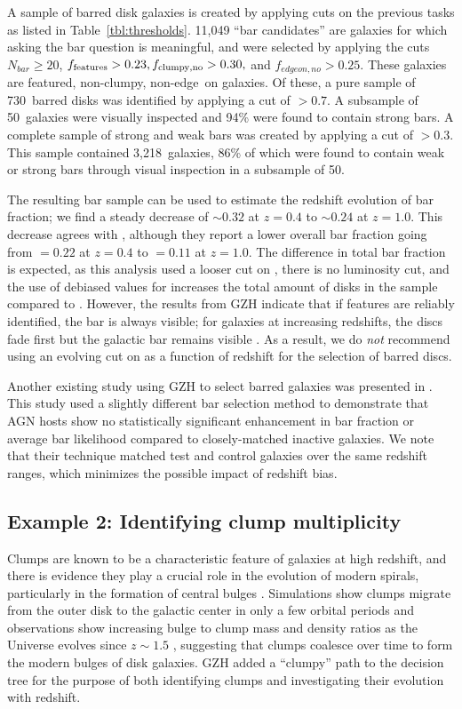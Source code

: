 \documentclass[twocolumn]{aastex6}
\begin{document}
A sample of barred disk galaxies is created by applying cuts on the previous
tasks as listed in Table~\ref{tbl:thresholds}. 11,049 ``bar candidates'' are
galaxies for which asking the bar question is meaningful, and were selected by
applying the cuts $N_{bar} \ge 20$, $f_{\rm features}>0.23, f_{\rm clumpy,no} >
0.30,$ and $f_{edgeon,no}>0.25$. These galaxies are featured, non-clumpy,
non-edge~on galaxies. Of these, a pure sample of 730~barred disks was
identified by applying a cut of \fbar$>0.7$. A subsample of 50~galaxies were
visually inspected and 94\% were found to contain strong bars. A complete
sample of strong and weak bars was created by applying a cut of \fbar$>0.3$.
This sample contained 3,218~galaxies, 86\% of which were found to contain weak
or strong bars through visual inspection in a subsample of 50.

The resulting bar sample can be used to estimate the redshift evolution of bar
fraction; we find a steady decrease of \fbar$\sim 0.32$ at $z=0.4$ to
\fbar$\sim 0.24$ at $z=1.0$. This decrease agrees with
\citet{mel14}, although they report a lower overall bar fraction going from
\fbar$=0.22$ at $z=0.4$ to \fbar$=0.11$ at $z=1.0$. The difference in total bar
fraction is expected, as this analysis used a looser cut on \fbar, there is no
luminosity cut, and the use of debiased values for \ffeatures{} increases the
total amount of disks in the sample compared to \citet{mel14}. However, the
results from GZH indicate that if features are reliably identified, the bar is
always visible; for galaxies at increasing redshifts, the discs fade first but
the galactic bar remains visible \citep{mel16}. As a result, we do \emph{not}
recommend using an evolving cut on \fbar{} as a function of redshift for the
selection of barred discs. 

Another existing study using GZH to select barred galaxies was presented in
\citet{che15}. This study used a slightly different bar selection method to
demonstrate that AGN hosts show no statistically significant enhancement in bar
fraction or average bar likelihood compared to closely-matched inactive
galaxies. We note that their technique matched test and control galaxies over
the same redshift ranges, which minimizes the possible impact of redshift bias.

\subsection{Example 2: Identifying clump multiplicity} Clumps are known to be a
characteristic feature of galaxies at high redshift, and there is
evidence they play a crucial role in the evolution of modern spirals,
particularly in the formation of central bulges
\citep{elm05,elm14,guo15,beh16}. Simulations show clumps migrate from the outer
disk to the galactic center in only a few orbital periods \citep{man15} and
observations show increasing bulge to clump mass and density ratios as the
Universe evolves since $z\sim 1.5$ \citep{elm09}, suggesting that clumps
coalesce over time to form the modern bulges of disk galaxies. GZH added a
``clumpy'' path to the decision tree for the purpose of both identifying clumps
and investigating their evolution with redshift. 
\end{document}
